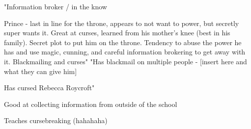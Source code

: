 \documentclass[char]{GL2020}
\begin{document}
\name{\cPrince{}}








"Information broker / in the know

Prince - last in line for the throne, appears to not want to power, but secretly super wants it.  Great at curses, learned from his mother's knee (best in his family).  Secret plot to put him on the throne.  Tendency to abuse the power he has and use magic, cunning, and careful information brokering to get away with it.  Blackmailing and curses"	"Has blackmail on multiple people - [insert here and what they can give him]

Has cursed Rebecca Roycroft"

Good at collecting information from outside of the school

Teaches cursebreaking (hahahaha)
\end{document}
